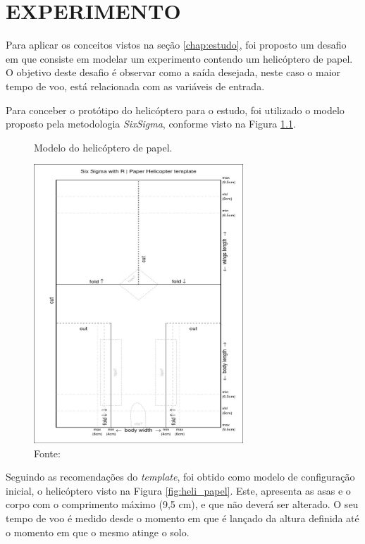 \chapter{EXPERIMENTO}
\label{chap:experimento}

Para aplicar os conceitos vistos na seção \ref{chap:estudo}, foi proposto um desafio em que consiste em modelar um experimento contendo um helicóptero de papel. O objetivo deste desafio é observar como a saída desejada, neste caso o maior tempo de voo, está relacionada com as variáveis de entrada.  

Para conceber o protótipo do helicóptero para o estudo, foi utilizado o modelo proposto pela metodologia \textit{SixSigma}, conforme visto na Figura \ref{fig:model_heli}. 

\begin{figure}[H]
  \caption{Modelo do helicóptero de papel.}
  \centering
  \includegraphics[width=0.7\textwidth]{images/helicopter.jpeg}
  \caption*{Fonte: \cite{Design}}
  \label{fig:model_heli}
\end{figure}

Seguindo as recomendações do \textit{template}, foi obtido como modelo de configuração inicial, o helicóptero visto na Figura \ref{fig:heli_papel}. Este, apresenta as asas e o corpo com o comprimento máximo (9,5 cm), e que não deverá ser alterado. O seu tempo de voo é medido desde o momento em que é lançado da altura definida até o momento em que o mesmo atinge o solo.

